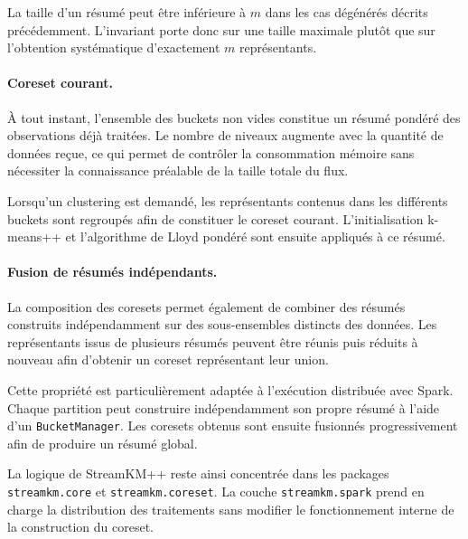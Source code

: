 La taille d'un résumé peut être inférieure à \(m\) dans les cas dégénérés décrits précédemment. L'invariant porte donc sur une taille maximale plutôt que sur l'obtention systématique d'exactement \(m\) représentants.

\paragraph{Coreset courant.}

À tout instant, l'ensemble des buckets non vides constitue un résumé pondéré des observations déjà traitées. Le nombre de niveaux augmente avec la quantité de données reçue, ce qui permet de contrôler la consommation mémoire sans nécessiter la connaissance préalable de la taille totale du flux.

Lorsqu'un clustering est demandé, les représentants contenus dans les différents buckets sont regroupés afin de constituer le coreset courant. L'initialisation k-means++ et l'algorithme de Lloyd pondéré sont ensuite appliqués à ce résumé.

\paragraph{Fusion de résumés indépendants.}

La composition des coresets permet également de combiner des résumés construits indépendamment sur des sous-ensembles distincts des données. Les représentants issus de plusieurs résumés peuvent être réunis puis réduits à nouveau afin d'obtenir un coreset représentant leur union.

Cette propriété est particulièrement adaptée à l'exécution distribuée avec Spark. Chaque partition peut construire indépendamment son propre résumé à l'aide d'un \texttt{BucketManager}. Les coresets obtenus sont ensuite fusionnés progressivement afin de produire un résumé global.

La logique de StreamKM++ reste ainsi concentrée dans les packages \texttt{streamkm.core} et \texttt{streamkm.coreset}. La couche \texttt{streamkm.spark} prend en charge la distribution des traitements sans modifier le fonctionnement interne de la construction du coreset.

